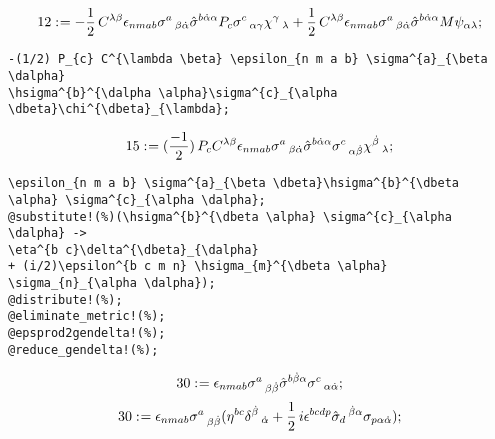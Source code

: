 \documentclass[11pt]{article}
\def\specialcolon{\mathrel{\mathop{:}}\hspace{-.5em}}
\begin{document}
\begin{dmath*}[compact, spread=2pt]
12\specialcolon{}=  - \frac{1}{2}\, {C}^{\lambda \beta} {\epsilon}_{n m a b} {\sigma}^{a}\,_{\beta \dot{\alpha}} {\hat{\sigma}}^{b \dot{\alpha} \alpha} {P}_{c} {\sigma}^{c}\,_{\alpha \gamma} {\chi}^{\gamma}\,_{\lambda} + \frac{1}{2}\, {C}^{\lambda \beta} {\epsilon}_{n m a b} {\sigma}^{a}\,_{\beta \dot{\alpha}} {\hat{\sigma}}^{b \dot{\alpha} \alpha} M {\psi}_{\alpha \lambda};
\end{dmath*}
{\color[named]{Blue}\begin{verbatim}
-(1/2) P_{c} C^{\lambda \beta} \epsilon_{n m a b} \sigma^{a}_{\beta \dalpha}
\hsigma^{b}^{\dalpha \alpha}\sigma^{c}_{\alpha \dbeta}\chi^{\dbeta}_{\lambda};
\end{verbatim}}
\begin{dmath*}[compact, spread=2pt]
15\specialcolon{}= (\frac{-1}{2})\, {P}_{c} {C}^{\lambda \beta} {\epsilon}_{n m a b} {\sigma}^{a}\,_{\beta \dot{\alpha}} {\hat{\sigma}}^{b \dot{\alpha} \alpha} {\sigma}^{c}\,_{\alpha \dot{\beta}} {\chi}^{\dot{\beta}}\,_{\lambda};
\end{dmath*}
{\color[named]{Blue}\begin{verbatim}
\epsilon_{n m a b} \sigma^{a}_{\beta \dbeta}\hsigma^{b}^{\dbeta \alpha} \sigma^{c}_{\alpha \dalpha};
@substitute!(%)(\hsigma^{b}^{\dbeta \alpha} \sigma^{c}_{\alpha \dalpha} -> 
\eta^{b c}\delta^{\dbeta}_{\dalpha} 
+ (i/2)\epsilon^{b c m n} \hsigma_{m}^{\dbeta \alpha} \sigma_{n}_{\alpha \dalpha});
@distribute!(%);
@eliminate_metric!(%);
@epsprod2gendelta!(%);
@reduce_gendelta!(%);
\end{verbatim}}
\begin{dmath*}[compact, spread=2pt]
30\specialcolon{}= {\epsilon}_{n m a b} {\sigma}^{a}\,_{\beta \dot{\beta}} {\hat{\sigma}}^{b \dot{\beta} \alpha} {\sigma}^{c}\,_{\alpha \dot{\alpha}};
\end{dmath*}
\begin{dmath*}[compact, spread=2pt]
30\specialcolon{}= {\epsilon}_{n m a b} {\sigma}^{a}\,_{\beta \dot{\beta}} ({\eta}^{b c} {\delta}^{\dot{\beta}}\,_{\dot{\alpha}} + \frac{1}{2}\, i {\epsilon}^{b c d p} {\hat{\sigma}}_{d}\,^{\dot{\beta} \alpha} {\sigma}_{p \alpha \dot{\alpha}});
\end{dmath*}
\end{document}
